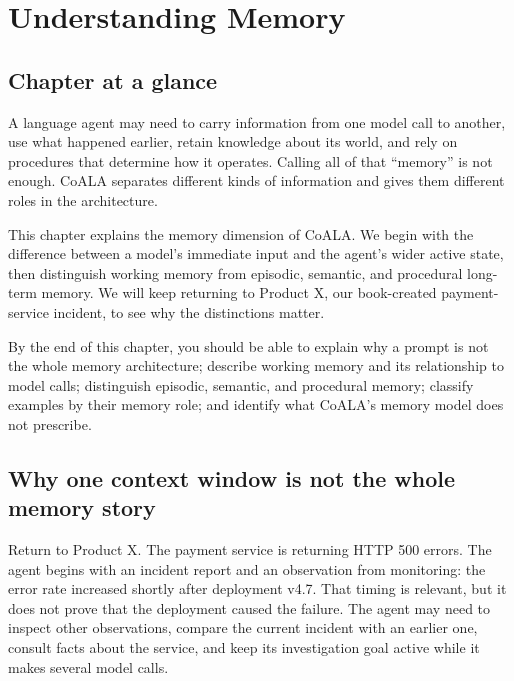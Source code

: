 \chapter{Understanding Memory}
\label{ch:understanding-memory}

\section*{Chapter at a glance}
{}

A language agent may need to carry information from one model call to another, use what happened earlier, retain knowledge about its world, and rely on procedures that determine how it operates. Calling all of that ``memory'' is not enough. CoALA separates different kinds of information and gives them different roles in the architecture.

This chapter explains the memory dimension of CoALA. We begin with the difference between a model's immediate input and the agent's wider active state, then distinguish working memory from episodic, semantic, and procedural long-term memory. We will keep returning to Product X, our book-created payment-service incident, to see why the distinctions matter.

\begin{learningbox}
By the end of this chapter, you should be able to explain why a prompt is not the whole memory architecture; describe working memory and its relationship to model calls; distinguish episodic, semantic, and procedural memory; classify examples by their memory role; and identify what CoALA's memory model does not prescribe.
\end{learningbox}

\section{Why one context window is not the whole memory story}
\label{sec:memory-beyond-context}

Return to Product X. The payment service is returning HTTP 500 errors. The agent begins with an incident report and an observation from monitoring: the error rate increased shortly after deployment v4.7. That timing is relevant, but it does not prove that the deployment caused the failure. The agent may need to inspect other observations, compare the current incident with an earlier one, consult facts about the service, and keep its investigation goal active while it makes several model calls.

